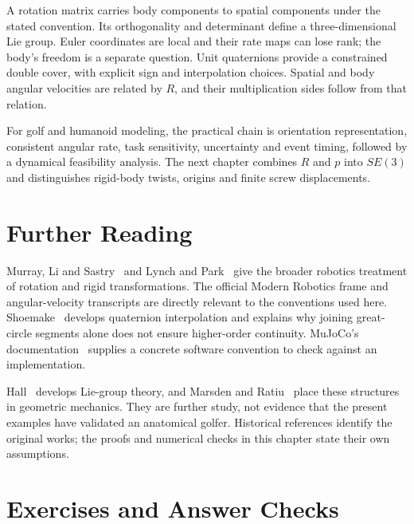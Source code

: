 A rotation matrix carries body components to spatial components under the stated convention. Its orthogonality and determinant define a three-dimensional Lie group. Euler coordinates are local and their rate maps can lose rank; the body's freedom is a separate question. Unit quaternions provide a constrained double cover, with explicit sign and interpolation choices. Spatial and body angular velocities are related by $R$, and their multiplication sides follow from that relation.

For golf and humanoid modeling, the practical chain is orientation representation, consistent angular rate, task sensitivity, uncertainty and event timing, followed by a dynamical feasibility analysis. The next chapter combines $R$ and $p$ into $SE(3)$ and distinguishes rigid-body twists, origins and finite screw displacements.

\section{Further Reading}
\label{sec:ch4_further_reading}

Murray, Li and Sastry~\cite{Murray1994} and Lynch and Park~\cite{Lynch2017} give the broader robotics treatment of rotation and rigid transformations. The official Modern Robotics frame and angular-velocity transcripts are directly relevant to the conventions used here. Shoemake~\cite{Shoemake1985RotationReview} develops quaternion interpolation and explains why joining great-circle segments alone does not ensure higher-order continuity. MuJoCo's documentation~\cite{MuJoCoRotationReview} supplies a concrete software convention to check against an implementation.

Hall~\cite{hall2015} develops Lie-group theory, and Marsden and Ratiu~\cite{marsden1999} place these structures in geometric mechanics. They are further study, not evidence that the present examples have validated an anatomical golfer. Historical references identify the original works; the proofs and numerical checks in this chapter state their own assumptions.

\section{Exercises and Answer Checks}
\label{sec:rotation_exercises}

